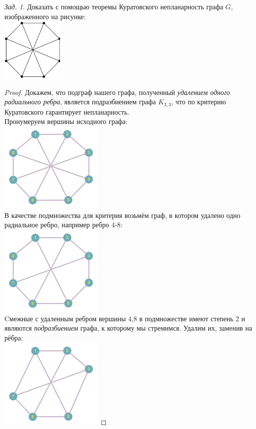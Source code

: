 \documentclass[a4paper,12pt]{article}
\numberwithin{figure}{section}
\theoremstyle{remark}
\newtheorem{problem}{Зад.}[section]
\begin{document}
\begin{problem}
	Доказать с помощью теоремы Куратовского непланарность графа $G$, изображенного на рисунке:
	\\ \includegraphics[width=3cm]{kuratovsky-task2-stage0-8angles.png}
\end{problem}
\begin{proof}
	Докажем, что подграф нашего графа, полученный \textit{удалением одного радиального ребра}, является подразбиением графа $K_{3,3}$, что по критерию Куратовского гарантирует непланарность.
	\\ Пронумеруем вершины исходного графа:
	\\ \includegraphics[width=5cm]{kuratovsky-task2-stage1.png}
	\\ В качестве подмножества для критерия возьмём граф, в котором удалено одно радиальное ребро, например ребро 4-8:
	\\ \includegraphics[width=5cm]{kuratovsky-task2-stage2.png}
	\\ Cмежные с удаленным ребром вершины 4,8 в подмножестве имеют степень 2 и являются \textit{подразбиением} графа, к которому мы стремимся. Удалим их, заменив на рёбра:
	\\ \includegraphics[width=5cm]{kuratovsky-task2-stage3.png}

\end{proof}
\end{document}
